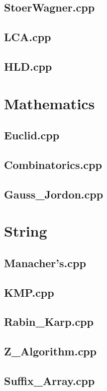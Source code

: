 \subsection{StoerWagner.cpp}

\subsection{LCA.cpp}

\subsection{HLD.cpp}

\section{Mathematics}
\subsection{Euclid.cpp}

\subsection{Combinatorics.cpp}

\subsection{Gauss\_Jordon.cpp}

\section{String}
\subsection{Manacher's.cpp}

\subsection{KMP.cpp}

\subsection{Rabin\_Karp.cpp}

\subsection{Z\_Algorithm.cpp}

\subsection{Suffix\_Array.cpp}

